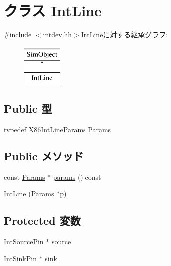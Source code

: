 \hypertarget{classX86ISA_1_1IntLine}{
\section{クラス IntLine}
\label{classX86ISA_1_1IntLine}
}


{\ttfamily \#include $<$intdev.hh$>$}IntLineに対する継承グラフ:\begin{figure}[H]
\begin{center}
\leavevmode
\includegraphics[height=2cm]{classX86ISA_1_1IntLine}
\end{center}
\end{figure}
\subsection*{Public 型}
\begin{DoxyCompactItemize}
\item 
typedef X86IntLineParams \hyperlink{classX86ISA_1_1IntLine_ae5b9ed84d6ad38984c5cc38e7336020d}{Params}
\end{DoxyCompactItemize}
\subsection*{Public メソッド}
\begin{DoxyCompactItemize}
\item 
const \hyperlink{classX86ISA_1_1IntLine_ae5b9ed84d6ad38984c5cc38e7336020d}{Params} $\ast$ \hyperlink{classX86ISA_1_1IntLine_acd3c3feb78ae7a8f88fe0f110a718dff}{params} () const 
\item 
\hyperlink{classX86ISA_1_1IntLine_ae188605f462d7a161f2792c8d052a8ab}{IntLine} (\hyperlink{classX86ISA_1_1IntLine_ae5b9ed84d6ad38984c5cc38e7336020d}{Params} $\ast$\hyperlink{namespaceX86ISA_af675c1d542a25b96e11164b80809a856}{p})
\end{DoxyCompactItemize}
\subsection*{Protected 変数}
\begin{DoxyCompactItemize}
\item 
\hyperlink{classX86ISA_1_1IntSourcePin}{IntSourcePin} $\ast$ \hyperlink{classX86ISA_1_1IntLine_a4fd3227605fc7dd8a6a2bfa8c932d895}{source}
\item 
\hyperlink{classX86ISA_1_1IntSinkPin}{IntSinkPin} $\ast$ \hyperlink{classX86ISA_1_1IntLine_aa415165ed2f6904baf81281b36029451}{sink}
\end{DoxyCompactItemize}


